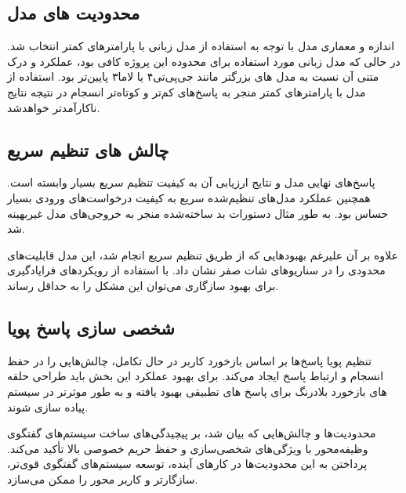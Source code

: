 \subsection{محدودیت های مدل}
اندازه و معماری مدل با توجه به استفاده از مدل زبانی با پارامترهای کمتر انتخاب شد. در حالی که مدل زبانی مورد استفاده برای محدوده این پروژه کافی بود، عملکرد و درک متنی آن نسبت به مدل های بزرگتر مانند جی‌پی‌تی۴ یا لاما۳ پایین‌تر بود. استفاده از مدل با پارامترهای کمتر منجر به پاسخ‌های کم‌تر و کوتاه‌تر انسجام در نتیجه نتایج ناکارآمدتر خواهدشد.


\subsection{چالش های تنظیم سریع}
پاسخ‌های نهایی مدل و نتایج ارزیابی آن به کیفیت تنظیم سریع بسیار وابسته است. همچنین عملکرد مدل‌های تنظیم‌شده سریع به کیفیت درخواست‌های ورودی بسیار حساس بود. به طور مثال دستورات بد ساخته‌شده منجر به خروجی‌های مدل غیربهینه شد.

علاوه بر آن علیرغم بهبودهایی که از طریق تنظیم سریع انجام شد، این مدل قابلیت‌های محدودی را در سناریوهای شات صفر نشان داد. با استفاده از رویکردهای فرایادگیری برای بهبود سازگاری می‌توان این مشکل را به حداقل رساند.

\subsection{شخصی سازی پاسخ پویا}

تنظیم پویا پاسخ‌ها بر اساس بازخورد کاربر در حال تکامل، چالش‌هایی را در حفظ انسجام و ارتباط پاسخ ایجاد می‌کند.
برای بهبود عملکرد این بخش باید طراحی حلقه های بازخورد بلادرنگ برای پاسخ های تطبیقی بهبود یافته و به طور موثرتر در سیستم پیاده سازی شوند.

محدودیت‌ها و چالش‌هایی که بیان شد، بر پیچیدگی‌های ساخت سیستم‌های گفتگوی وظیفه‌محور با ویژگی‌های شخصی‌سازی و حفظ حریم خصوصی بالا تأکید می‌کند. پرداختن به این محدودیت‌ها در کارهای آینده، توسعه سیستم‌های گفتگوی قوی‌تر، سازگارتر و کاربر محور را ممکن می‌سازد.